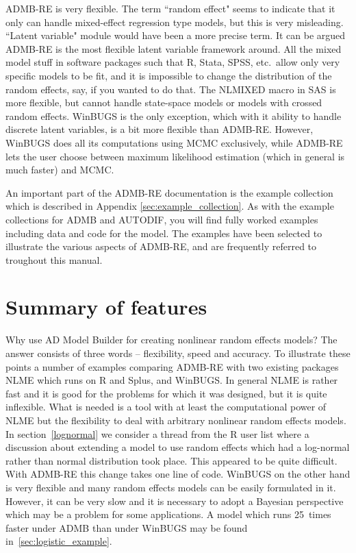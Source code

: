 \documentclass[12pt,letter,reqno]{book}
\begin{document}
ADMB-RE is very flexible. The term ``random effect" seems to indicate that it only can handle mixed-effect
regression type models, but this is very misleading. ``Latent variable" module would have
been a more precise term. It can be argued ADMB-RE is the most flexible latent variable framework around.
All the mixed model stuff in software packages such that R, Stata, SPSS, etc.~allow only very specific models
to be fit, and it is impossible to change the distribution of the random effects, say, if you wanted to do that.
The NLMIXED macro in SAS is more flexible, but cannot handle state-space models or models with crossed
random effects. WinBUGS is the only exception, which with it ability to handle discrete
latent variables, is a bit more flexible than ADMB-RE. However, WinBUGS does all its computations using MCMC exclusively,
while ADMB-RE lets the user choose between maximum likelihood estimation (which in general is much faster) and MCMC.

An important part of the ADMB-RE documentation is the example collection which is described in Appendix \ref{sec:example_collection}.
As with the example collections for ADMB and AUTODIF, you will find fully worked examples including data and code for the model. 
The examples have been selected to illustrate the various aspects of ADMB-RE, and are frequently referred to troughout this manual.


\section{Summary of features}
Why use AD Model Builder for creating nonlinear random effects models? The answer consists of three words --
flexibility, speed and accuracy. To illustrate these points a number of examples comparing ADMB-RE with two
existing packages NLME which runs on R and Splus, and WinBUGS. In general NLME is rather fast and it is good for
the problems for which it was designed, but it is quite inflexible. What is needed is a tool with at least the
computational power of NLME but the flexibility to deal with arbitrary nonlinear random effects models. In
section~\ref{lognormal} we consider a thread from the R user list where a discussion about extending a model to
use random effects which had a log-normal rather than normal distribution took place. This appeared to be quite
difficult. With ADMB-RE this change takes one line of code. WinBUGS on the other hand is very flexible and many
random effects models can be easily formulated in it. However, it can be very slow and it is necessary to adopt
a Bayesian perspective which may be a problem for some applications. 
A model which runs 25~times faster under ADMB than under WinBUGS may be found in~\ref{sec:logistic_example}.
\end{document}

